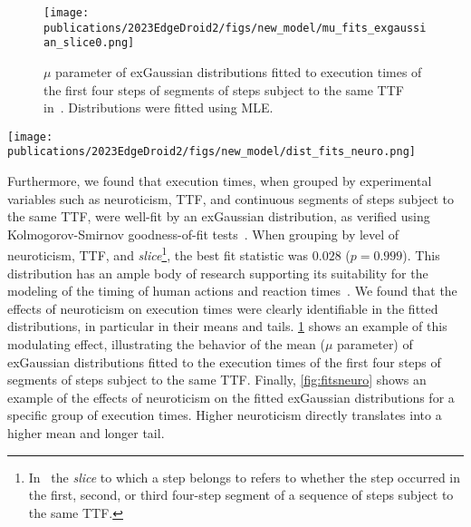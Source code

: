 \begin{figure}
    \centering
    \texttt{[image: publications/2023EdgeDroid2/figs/new\_model/mu\_fits\_exgaussian\_slice0.png]}
    \caption{%
        \( \mu \) parameter of \acs*{exGaussian} distributions fitted to execution times of the first four steps of segments of steps subject to the same \gls{TTF} in~\cite{olguinmunoz:impact2021}.
        Distributions were fitted using \gls{MLE}.
    }\label{fig:muexgaussian}
\end{figure}

\begin{figure*}
    \centering
    \texttt{[image: publications/2023EdgeDroid2/figs/new\_model/dist\_fits\_neuro.png]}
    \caption{%
        Example \gls{exGaussian} fits on execution times from steps \numrange{4}{8} in a segment of steps at the maximum experimental \gls{TTF}.
        The effects of neuroticism are clearly visible in the tail and the mean of the distributions.
    }\label{fig:fitsneuro}
\end{figure*}

Furthermore, we found that execution times, when grouped by experimental variables such as neuroticism, \gls{TTF}, and continuous segments of steps subject to the same \gls{TTF}, were well-fit by an \gls{exGaussian} distribution, as verified using Kolmogorov-Smirnov goodness-of-fit tests~\cite{massey1951kolmogorov}.
When grouping by level of neuroticism, \gls{TTF}, and \emph{slice}\footnote{%
In~\cite{olguinmunoz:impact2021} the \emph{slice} to which a step belongs to refers to whether the step occurred in the first, second, or third four-step segment of a sequence of steps subject to the same \gls{TTF}.
}, the best fit statistic was \ensuremath{0.028} (\ensuremath{p = 0.999}).
This distribution has an ample body of research supporting its suitability for the modeling of the timing of human actions and reaction times~\cite{Rohrer1994analysis,Palmer2011shapes,Marmolejo2022generalised}.
We found that the effects of neuroticism on execution times were clearly identifiable in the fitted distributions, in particular in their means and tails.
\cref{fig:muexgaussian} shows an example of this modulating effect, illustrating the behavior of the mean (\( \mu \) parameter) of \gls{exGaussian} distributions fitted to the execution times of the first four steps of segments of steps subject to the same \gls{TTF}.
Finally, \cref{fig:fitsneuro} shows an example of the effects of neuroticism on the fitted \gls{exGaussian} distributions for a specific group of execution times.
Higher neuroticism directly translates into a higher mean and longer tail.